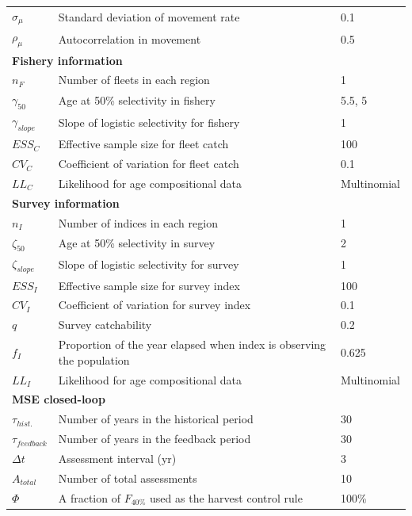 \begin{center}
\begin{longtable}{p{2cm} p{10cm} p{3cm}}
$\sigma_\mu$ & Standard deviation of movement rate & 0.1 \tabularnewline
$\rho_\mu$ & Autocorrelation in movement & 0.5 \tabularnewline

\multicolumn{3}{l}{\textbf{Fishery information}} \tabularnewline
$n_{F}$ & Number of fleets in each region & 1 \tabularnewline
$\gamma_{50}$ & Age at 50\% selectivity in fishery & 5.5, 5 \tabularnewline
$\gamma_{slope} $ & Slope of logistic selectivity for fishery & 1 \tabularnewline
$ESS_{C}$ & Effective sample size for fleet catch & 100 \tabularnewline
$CV_{C}$ & Coefficient of variation for fleet catch & 0.1 \tabularnewline
$LL_{C}$ & Likelihood for age compositional data & Multinomial \tabularnewline

\multicolumn{3}{l}{\textbf{Survey information}} \tabularnewline
$n_{I}$ & Number of indices in each region & 1 \tabularnewline
$\zeta_{50}$ & Age at 50\% selectivity in survey & 2 \tabularnewline
$\zeta_{slope}$ & Slope of logistic selectivity for survey & 1 \tabularnewline
$ESS_{I}$ & Effective sample size for survey index & 100 \tabularnewline
$CV_{I}$ & Coefficient of variation for survey index & 0.1 \tabularnewline
$q$ & Survey catchability & 0.2 \tabularnewline
$f_{I}$ & Proportion of the year elapsed when index is observing the population & 0.625 \tabularnewline
$LL_{I}$ & Likelihood for age compositional data & Multinomial \tabularnewline

\multicolumn{3}{l}{\textbf{MSE closed-loop}} \tabularnewline
$\tau_{hist.}$ & Number of years in the historical period & 30 \tabularnewline
$\tau_{feedback}$ & Number of years in the feedback period & 30 \tabularnewline
$\Delta t$ & Assessment interval (yr) & 3 \tabularnewline
$A_{total}$ & Number of total assessments & 10 \tabularnewline
$\Phi$ & A fraction of $F_{40\%}$ used as the harvest control rule & 100\% \tabularnewline

\hline
\end{longtable}
\end{center}

